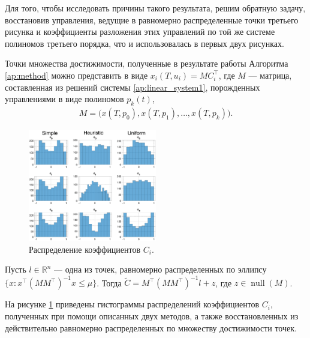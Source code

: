 \documentclass[../main.tex]{subfiles}
\begin{document}
  Для того, чтобы исследовать причины такого результата, решим обратную задачу, восстановив управления, ведущие в равномерно распределенные точки третьего рисунка и коэффициенты разложения этих управлений по той же системе полиномов третьего порядка, что и использовалась в первых двух рисунках.
  
  Точки множества достижимости, полученные в результате работы Алгоритма \ref{ap:method} можно представить в виде $x_i(T, u_i) = M C_i^{\top}$, где $M$ --- матрица, составленная из решений системы \eqref{ap:linear_system1}, порожденных управлениями в виде полиномов $p_k(t)$, 
  \begin{gather}
  	 M = \big(x(T, p_0), x(T, p_1), \dots, x(T, p_k)\big).
  \end{gather} 
  
    \begin{figure}[ht]
  	\centering
  	\includegraphics[width=0.5\textwidth]{images/three_coefficients_distribution.eps}
  	\caption{Распределение коэффициентов $C_i$.}
  	\label{fig:ap:three_coefficients_distribution}
  \end{figure}
  
  Пусть $l\in \mathbb{R}^{n}$ --- одна из точек, равномерно распределенных по эллипсу $\{x: x^{\top} (M M^{\top})^{-1} x \leqslant \mu \}$.
  Тогда $\widetilde{C} = M^{\top} (M M^{\top})^{-1} l + z$, где $z \in \operatorname{null}(M)$.
  
  На рисунке \ref{fig:ap:three_coefficients_distribution} приведены гистограммы распределений коэффициентов $C_i$, полученных при помощи описанных двух методов, а также восстановленных из действительно равномерно распределенных по множеству достижимости точек. 
  
\end{document}
